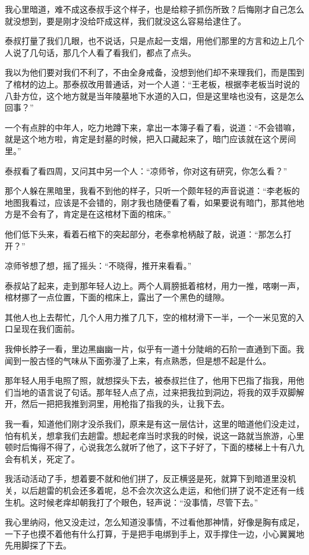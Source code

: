我心里暗道，难不成这泰叔手这个样子，也是给粽子抓伤所致？后悔刚才自己怎么就没想到，要是刚才没给吓成这样，我们就没这么容易给逮住了。

泰叔打量了我们几眼，也不说话，只是点起一支烟，用他们那里的方言和边上几个人说了几句话，那几个人看了看我们，都点了点头。

我以为他们要对我们不利了，不由全身戒备，没想到他们却不来理我们，而是围到了棺材的边上。那泰叔改用普通话，对一个人道：“王老板，根据李老板当时说的八卦方位，这个地方就是当年陵墓地下水道的入口，但是这里啥也没有，这是怎么回事？”

一个有点胖的中年人，吃力地蹲下来，拿出一本簿子看了看，说道：“不会错嘛，就是这个地方啦，肯定是封墓的时候，把入口藏起来了，暗门应该就在这个房间里。”

泰叔看了看四周，又问其中另一个人：“凉师爷，你对这有研究，你怎么看？”

那个人躲在黑暗里，我看不到他的样子，只听一个颇年轻的声音说道：“李老板的地图我看过，应该是不会错的，刚才我也随便看了看，如果要说有暗门，那其他地方是不会有了，肯定是在这棺材下面的棺床。”

他们低下头来，看着石棺下的突起部分，老泰拿枪柄敲了敲，说道：“那怎么打开？”

凉师爷想了想，摇了摇头：“不晓得，推开来看看。”

泰叔站了起来，走到那年轻人边上。两个人肩膀抵着棺材，用力一推，喀喇一声，棺材挪了一点位置，下面的棺床上，露出了一个黑色的缝隙。

其他人也上去帮忙，几个人用力推了几下，空的棺材滑下一半，一个一米见宽的入口呈现在我们面前。

我伸长脖子一看，里边黑幽幽一片，似乎有一道十分陡峭的石阶一直通到下面。我闻到一股古怪的气味从下面弥漫了上来，有点熟悉，但是想不起是什么。

那年轻人用手电照了照，就想探头下去，被泰叔拦住了，他用下巴指了指我，用他们当地的语言说了句话。那年轻人点了点，过来把我拉到洞边，将我的双手双脚解开，然后一把把我推到洞里，用枪指了指我的头，让我下去。

我一看，知道他们刚才没杀我们，原来是有这一层估计，这里的暗道他们没走过，怕有机关，想拿我们去趟雷。想起老痒当时求我的时候，说这一路就当旅游，心里顿时后悔得不得了，心说我怎么就听了他了，这下子好了，下面的楼梯上十有八九会有机关，死定了。

我活动活动了手，想着要不就和他们拼了，反正横竖是死，就算下到暗道里没机关，以后趟雷的机会还多着呢，总不会次次这么走运，和他们拼了说不定还有一线生机。这时候老痒却朝我打了个眼色，轻声说：“没事情，尽管下去。”

我心里纳闷，他又没走过，怎么知道没事情，不过看他那神情，好像是胸有成足，一下子也摸不着他有什么打算，于是把手电绑到手上，双手撑住一边，小心翼翼地先用脚探了下去。

